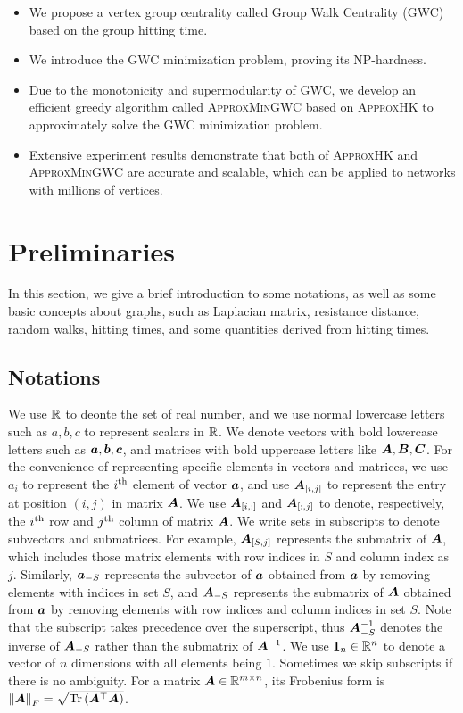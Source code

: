 \documentclass[10pt,twocolumn,twoside]{IEEEtran}
\begin{document}
    \begin{itemize}
        \item We propose a vertex group centrality called Group Walk Centrality (GWC) based on the group hitting time.
        \item We introduce the GWC minimization problem, proving its NP-hardness.
        \item Due to the monotonicity and supermodularity of GWC, we develop an efficient greedy algorithm called \textsc{ApproxMinGWC} based on \textsc{ApproxHK} to approximately solve the GWC minimization problem.
        \item Extensive experiment results demonstrate that both of \textsc{ApproxHK} and \textsc{ApproxMinGWC} are accurate and scalable, which can be applied to networks with millions of vertices.
    \end{itemize}
\fi

\section{Preliminaries}

In this section, we give a brief introduction to some notations, as well as some basic concepts about graphs, such as Laplacian matrix, resistance distance, random walks, hitting times, and some quantities derived from hitting times.

\subsection{Notations}

We use  \(\mathbb{R}\) to deonte the set of real number, and we use normal lowercase letters such as \(a,b,c\) to represent scalars in \(\mathbb{R}\). We denote vectors with bold lowercase letters such as \(\boldsymbol{a},\boldsymbol{b},\boldsymbol{c}\), and matrices with bold uppercase letters like \(\boldsymbol{A},\boldsymbol{B},\boldsymbol{C}\). For the convenience of representing specific elements in vectors and matrices, we use \(a_{i}\) to represent the \({i}^{\rm{th}}\) element of vector \(\boldsymbol{a}\), and use \(\boldsymbol{A}_{[i,j]}\) to represent the entry at position \((i,j)\) in matrix \(\boldsymbol{A}\). We use \(\boldsymbol{A}_{[i,:]}\) and \(\boldsymbol{A}_{[:,j]}\) to denote, respectively, the \({i}^{\rm{th}}\) row and \({j}^{\rm{th}}\) column of matrix \(\boldsymbol{A}\). We write sets in subscripts to denote subvectors and submatrices.
For example, \(\boldsymbol{A}_{[S,j]}\) represents the submatrix of \(\boldsymbol{A}\), which includes those matrix elements with row indices in \(S\) and column index as \(j\). Similarly, \(\boldsymbol{a}_{-S}\) represents the subvector of \(\boldsymbol{a}\) obtained from  \(\boldsymbol{a}\) by removing elements with indices in set \(S\), and \(\boldsymbol{A}_{-S}\) represents the submatrix of \(\boldsymbol{A}\) obtained  from  \(\boldsymbol{a}\) by removing elements with row indices and column indices in set \(S\).
Note that the subscript takes precedence over the superscript, thus \(\boldsymbol{A}_{-S}^{-1}\) denotes the inverse of \(\boldsymbol{A}_{-S}\) rather than the submatrix of \(\boldsymbol{A}^{-1}\). We use  \(\boldsymbol{1}_n\in \mathbb{R}^n\) to denote a vector of \(n\) dimensions with all elements being \(1\). Sometimes we skip subscripts if there is no ambiguity. For a matrix \(\boldsymbol{A}\in\mathbb{R}^{m\times n}\), its Frobenius form is \(\left\Vert\boldsymbol{A}\right\Vert_F=\sqrt{\mathrm{Tr}\left(\boldsymbol{A}^\top\boldsymbol{A}\right)}\).
\end{document}
